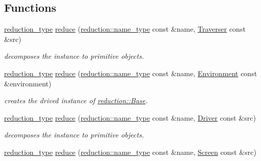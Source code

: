\subsection*{Functions}
\begin{DoxyCompactItemize}
\item 
\hypertarget{namespacehryky_1_1display_aeff2be235ded726f0f4ff47d3e047f47}{\hyperlink{namespacehryky_a343a9a4c36a586be5c2693156200eadc}{reduction\-\_\-type} \hyperlink{namespacehryky_1_1display_aeff2be235ded726f0f4ff47d3e047f47}{reduce} (\hyperlink{namespacehryky_1_1reduction_ac686c30a4c8d196bbd0f05629a6b921f}{reduction\-::name\-\_\-type} const \&name, \hyperlink{classhryky_1_1display_1_1_traverser}{Traverser} const \&src)}\label{namespacehryky_1_1display_aeff2be235ded726f0f4ff47d3e047f47}

\begin{DoxyCompactList}\small\item\em decomposes the instance to primitive objects. \end{DoxyCompactList}\item 
\hypertarget{namespacehryky_1_1display_a00684c0c177cc8fc95639e8533c2441a}{\hyperlink{namespacehryky_a343a9a4c36a586be5c2693156200eadc}{reduction\-\_\-type} \hyperlink{namespacehryky_1_1display_a00684c0c177cc8fc95639e8533c2441a}{reduce} (\hyperlink{namespacehryky_1_1reduction_ac686c30a4c8d196bbd0f05629a6b921f}{reduction\-::name\-\_\-type} const \&name, \hyperlink{classhryky_1_1display_1_1_environment}{Environment} const \&environment)}\label{namespacehryky_1_1display_a00684c0c177cc8fc95639e8533c2441a}

\begin{DoxyCompactList}\small\item\em creates the drived instance of \hyperlink{classhryky_1_1reduction_1_1_base}{reduction\-::\-Base}. \end{DoxyCompactList}\item 
\hypertarget{namespacehryky_1_1display_a705ac3a5de0998e1e0d3fa595044ec55}{\hyperlink{namespacehryky_a343a9a4c36a586be5c2693156200eadc}{reduction\-\_\-type} \hyperlink{namespacehryky_1_1display_a705ac3a5de0998e1e0d3fa595044ec55}{reduce} (\hyperlink{namespacehryky_1_1reduction_ac686c30a4c8d196bbd0f05629a6b921f}{reduction\-::name\-\_\-type} const \&name, \hyperlink{classhryky_1_1display_1_1_driver}{Driver} const \&src)}\label{namespacehryky_1_1display_a705ac3a5de0998e1e0d3fa595044ec55}

\begin{DoxyCompactList}\small\item\em decomposes the instance to primitive objects. \end{DoxyCompactList}\item 
\hypertarget{namespacehryky_1_1display_a5846a438cf9196a272dde4d17b43ba83}{\hyperlink{namespacehryky_a343a9a4c36a586be5c2693156200eadc}{reduction\-\_\-type} \hyperlink{namespacehryky_1_1display_a5846a438cf9196a272dde4d17b43ba83}{reduce} (\hyperlink{namespacehryky_1_1reduction_ac686c30a4c8d196bbd0f05629a6b921f}{reduction\-::name\-\_\-type} const \&name, \hyperlink{classhryky_1_1display_1_1_screen}{Screen} const \&src)}\label{namespacehryky_1_1display_a5846a438cf9196a272dde4d17b43ba83}


\end{DoxyCompactItemize}
